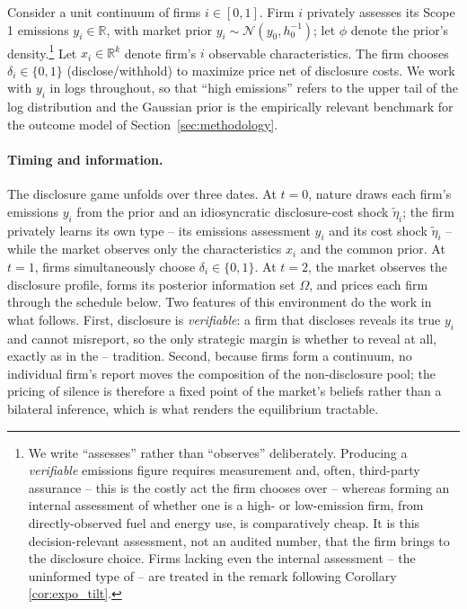\documentclass[a4paper,12pt]{article}
\newcommand{\citet}[1]{\textcite{#1}}
\begin{document}
Consider a unit continuum of firms $i \in [0,1]$. Firm $i$ privately assesses its Scope 1 emissions $y_i \in \mathbb{R}$, with market prior $y_i \sim \mathcal{N}(y_0, h_0^{-1})$; let $\phi$ denote the prior's density.\footnote{We write ``assesses'' rather than ``observes'' deliberately. Producing a \emph{verifiable} emissions figure requires measurement and, often, third-party assurance -- this is the costly act the firm chooses over -- whereas forming an internal assessment of whether one is a high- or low-emission firm, from directly-observed fuel and energy use, is comparatively cheap. It is this decision-relevant assessment, not an audited number, that the firm brings to the disclosure choice. Firms lacking even the internal assessment -- the uninformed type of \citet{dye1985disclosure} -- are treated in the remark following Corollary \ref{cor:expo_tilt}.} Let $x_i  \in \mathbb{R}^k$ denote firm's $i$ observable characteristics. The firm chooses $\delta_i \in \{0,1\}$ (disclose/withhold) to maximize price net of disclosure costs. We work with $y_i$ in logs throughout, so that ``high emissions'' refers to the upper tail of the log distribution and the Gaussian prior is the empirically relevant benchmark for the outcome model of Section~\ref{sec:methodology}.

\paragraph{Timing and information.} The disclosure game unfolds over three dates. At $t=0$, nature draws each firm's emissions $y_i$ from the prior and an idiosyncratic disclosure-cost shock $\tilde\eta_i$; the firm privately learns its own type -- its emissions assessment $y_i$ and its cost shock $\tilde\eta_i$ -- while the market observes only the characteristics $x_i$ and the common prior. At $t=1$, firms simultaneously choose $\delta_i \in \{0,1\}$. At $t=2$, the market observes the disclosure profile, forms its posterior information set $\Omega$, and prices each firm through the schedule below. Two features of this environment do the work in what follows. First, disclosure is \emph{verifiable}: a firm that discloses reveals its true $y_i$ and cannot misreport, so the only strategic margin is whether to reveal at all, exactly as in the \citet{grossman1981informational}-- \citet{milgrom1981good} tradition. Second, because firms form a continuum, no individual firm's report moves the composition of the non-disclosure pool; the pricing of silence is therefore a fixed point of the market's beliefs rather than a bilateral inference, which is what renders the equilibrium tractable.
\end{document}
